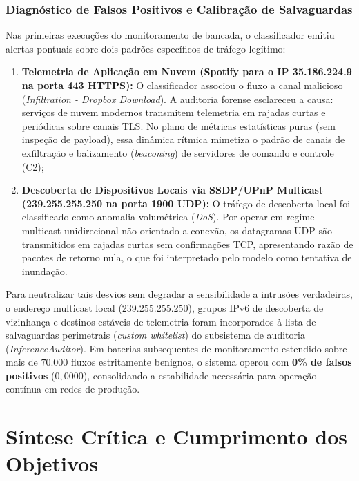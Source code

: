 \subsubsection{Diagnóstico de Falsos Positivos e Calibração de Salvaguardas}

Nas primeiras execuções do monitoramento de bancada, o classificador emitiu alertas pontuais sobre dois
padrões específicos de tráfego legítimo:
\begin{enumerate}
    \item \textbf{Telemetria de Aplicação em Nuvem (Spotify para o IP 35.186.224.9 na porta 443 HTTPS):}
    O classificador associou o fluxo a canal malicioso (\emph{Infiltration - Dropbox Download}). A
    auditoria forense esclareceu a causa: serviços de nuvem modernos transmitem telemetria em rajadas
    curtas e periódicas sobre canais TLS. No plano de métricas estatísticas puras (sem inspeção de payload),
    essa dinâmica rítmica mimetiza o padrão de canais de exfiltração e balizamento (\emph{beaconing}) de
    servidores de comando e controle (C2);
    
    \item \textbf{Descoberta de Dispositivos Locais via SSDP/UPnP Multicast (239.255.255.250 na porta 1900 UDP):}
    O tráfego de descoberta local foi classificado como anomalia volumétrica (\emph{DoS}). Por operar em
    regime multicast unidirecional não orientado a conexão, os datagramas UDP são transmitidos em rajadas
    curtas sem confirmações TCP, apresentando razão de pacotes de retorno nula, o que foi interpretado pelo
    modelo como tentativa de inundação.
\end{enumerate}

Para neutralizar tais desvios sem degradar a sensibilidade a intrusões verdadeiras, o endereço multicast
local (239.255.255.250), grupos IPv6 de descoberta de vizinhança e destinos estáveis de telemetria foram
incorporados à lista de salvaguardas perimetrais (\emph{custom whitelist}) do subsistema de auditoria
(\emph{InferenceAuditor}). Em baterias subsequentes de monitoramento estendido sobre mais de $70.000$
fluxos estritamente benignos, o sistema operou com \textbf{0\% de falsos positivos} ($0{,}0000$),
consolidando a estabilidade necessária para operação contínua em redes de produção.

\section{Síntese Crítica e Cumprimento dos Objetivos}
\label{sec:sintese_cumprimento_objetivos}

